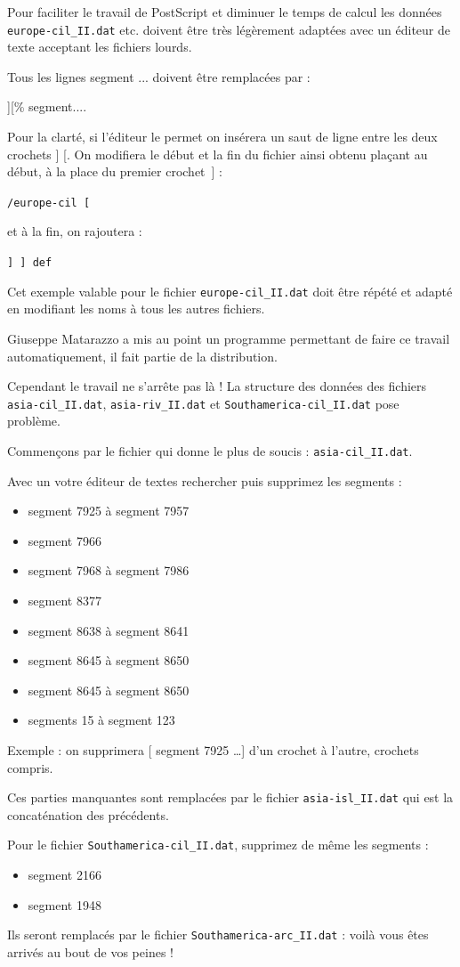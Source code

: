 \documentclass[11pt,french,BCOR10mm,DIV12,bibliography=totoc,parskip=false,
   smallheadings, headexclude,footexclude,oneside]{pst-doc}
\begin{document}
Pour faciliter le travail de PostScript et diminuer le temps de
calcul les données \verb|europe-cil_II.dat| etc. doivent être très
légèrement adaptées avec un éditeur de texte acceptant les
fichiers lourds.

Tous les lignes \textsf{segment ...} doivent être remplacées par :

\textsf{][\% segment...}.

Pour la clarté, si l'éditeur le permet
on insérera un saut de ligne entre les deux crochets \textsf{] [}.
On modifiera le début et la fin du fichier ainsi obtenu plaçant au
début, à la place du premier crochet~] :

\verb|/europe-cil [|

et à la fin, on rajoutera :

\verb|] ] def|

Cet exemple valable pour le fichier \verb|europe-cil_II.dat| doit
être répété et adapté en modifiant les noms à tous les autres
fichiers.

Giuseppe Matarazzo a mis au point un programme permettant de faire
ce travail automatiquement, il fait partie de la distribution.

Cependant le travail ne s'arrête pas là ! La structure des données
des fichiers \verb|asia-cil_II.dat|, \verb|asia-riv_II.dat| et
\verb|Southamerica-cil_II.dat| pose problème.

Commençons par le fichier qui donne le plus de soucis :
\verb|asia-cil_II.dat|.

Avec un votre éditeur de textes rechercher puis supprimez les
segments :
\begin{itemize}
\item segment 7925 à segment 7957
\item segment 7966
\item segment 7968 à segment 7986
\item segment 8377
\item segment 8638 à segment 8641
\item segment 8645 à segment 8650
\item segment 8645 à segment 8650
\item segments 15 à segment 123
\end{itemize}
Exemple : on supprimera [ segment 7925 \ldots ] d'un crochet à
l'autre, crochets compris.

Ces parties manquantes sont remplacées par le fichier
\verb|asia-isl_II.dat| qui est la concaténation des précédents.

Pour le fichier \verb|Southamerica-cil_II.dat|, supprimez de même les segments
:
\begin{itemize}
\item segment 2166
\item segment 1948
\end{itemize}
Ils seront remplacés par le fichier \verb|Southamerica-arc_II.dat| : voilà
vous êtes arrivés au bout de vos peines !
\end{document}
